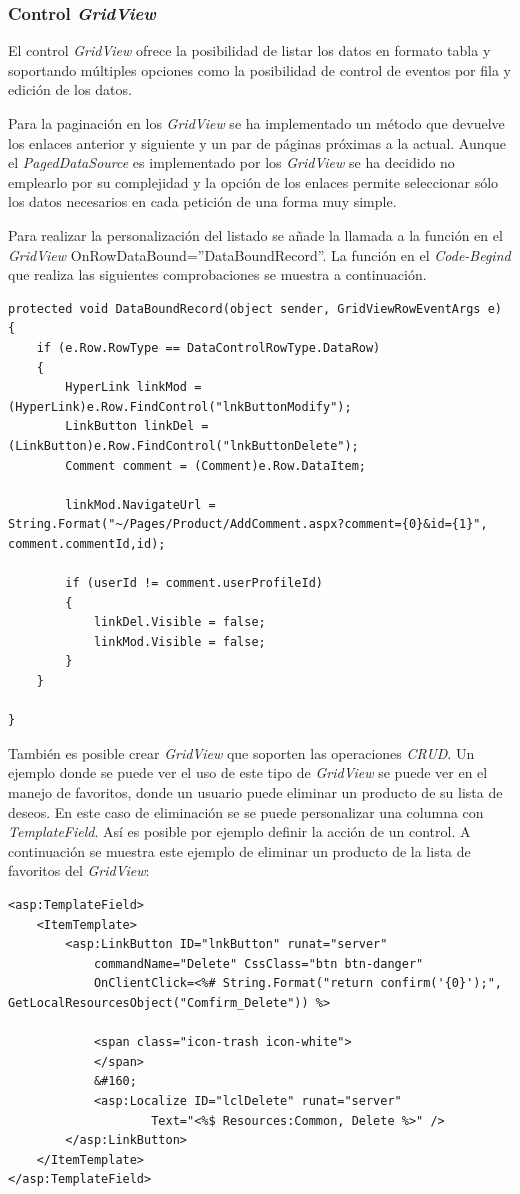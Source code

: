 \documentclass{article}
\begin{document}
\subsubsection{Control \emph{GridView}}
	El control \emph{GridView} ofrece la posibilidad de listar los datos en formato tabla y soportando múltiples opciones como la posibilidad de control de eventos por fila y edición de los datos.
	
	Para la paginación en los \emph{GridView} se ha implementado un método que devuelve los enlaces anterior y siguiente y un par de páginas próximas a la actual. Aunque el \emph{PagedDataSource} es implementado por los \emph{GridView} se ha decidido no emplearlo por su complejidad y la opción de los enlaces permite seleccionar sólo los datos necesarios en cada petición de una forma muy simple.
	
	Para realizar la personalización del listado se añade la llamada a la función en el \emph{GridView}  {\color{red} OnRowDataBound}{\color{blue}=''DataBoundRecord''}. La función en el \emph{Code-Begind} que realiza las siguientes comprobaciones se muestra a continuación.	

\begin{lstlisting}[style=sharpc]
protected void DataBoundRecord(object sender, GridViewRowEventArgs e)
{
	if (e.Row.RowType == DataControlRowType.DataRow)
	{
		HyperLink linkMod = (HyperLink)e.Row.FindControl("lnkButtonModify");
		LinkButton linkDel = (LinkButton)e.Row.FindControl("lnkButtonDelete");
		Comment comment = (Comment)e.Row.DataItem;

		linkMod.NavigateUrl = String.Format("~/Pages/Product/AddComment.aspx?comment={0}&id={1}", comment.commentId,id);

		if (userId != comment.userProfileId)
		{
			linkDel.Visible = false;
			linkMod.Visible = false;
		}
	}

}
\end{lstlisting}

	También es posible crear \emph{GridView} que soporten las operaciones \emph{CRUD}. Un ejemplo donde se puede ver el uso de este tipo de \emph{GridView} se puede ver en el manejo de favoritos, donde un usuario puede eliminar un producto de su lista de deseos. En este caso de eliminación se se puede personalizar una columna con \emph{TemplateField}. Así es posible por ejemplo definir la acción de un control. A continuación se muestra este ejemplo de eliminar un producto de la lista de favoritos del \emph{GridView}:

\begin{lstlisting}[style=xml]
<asp:TemplateField>
	<ItemTemplate>
		<asp:LinkButton ID="lnkButton" runat="server"
		    commandName="Delete" CssClass="btn btn-danger"
		    OnClientClick=<%# String.Format("return confirm('{0}');", GetLocalResourcesObject("Comfirm_Delete")) %>
			
			<span class="icon-trash icon-white">
		    </span>
		    &#160;
		    <asp:Localize ID="lclDelete" runat="server"
		    	    Text="<%$ Resources:Common, Delete %>" />
		</asp:LinkButton>
	</ItemTemplate>
</asp:TemplateField>
\end{lstlisting}
\end{document}
